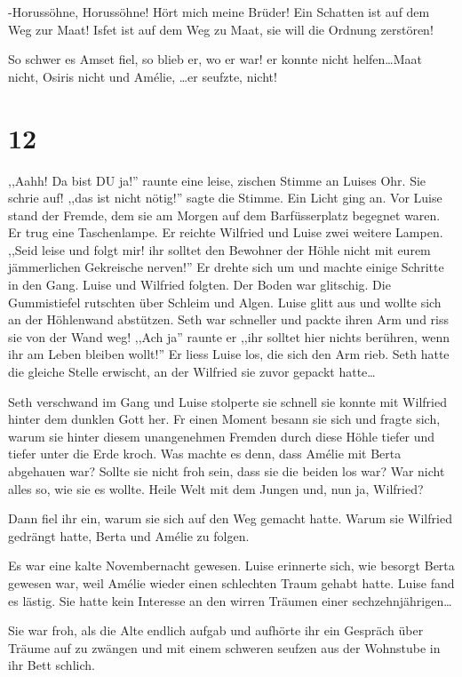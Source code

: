 -Horussöhne, Horussöhne! Hört mich meine Brüder! Ein Schatten ist auf dem Weg zur Maat! Isfet ist auf dem Weg zu Maat, sie will die Ordnung  zerstören!

So schwer es Amset fiel, so blieb er, wo er war! er konnte nicht helfen\dots Maat nicht, Osiris nicht und Amélie, \dots er seufzte, nicht!

\section*{12}

,,Aahh! Da bist DU ja!'' raunte eine leise, zischen Stimme an Luises Ohr. Sie schrie auf! ,,das ist nicht nötig!'' sagte die Stimme. Ein Licht ging an. Vor Luise stand der Fremde, dem sie am Morgen auf dem Barfüsserplatz begegnet waren. Er trug eine Taschenlampe. Er reichte Wilfried und Luise zwei weitere Lampen. ,,Seid leise und folgt mir! ihr solltet den Bewohner der Höhle nicht mit eurem jämmerlichen Gekreische nerven!'' Er drehte sich um und machte einige Schritte in den Gang. Luise und Wilfried folgten. Der Boden war glitschig. Die Gummistiefel rutschten über Schleim und Algen. Luise glitt aus und wollte sich an der Höhlenwand abstützen. Seth war schneller und packte ihren Arm und riss sie von der Wand weg! ,,Ach ja'' raunte er ,,ihr solltet hier nichts berühren, wenn ihr am Leben bleiben wollt!'' Er liess Luise los, die sich den Arm rieb. Seth hatte die gleiche Stelle erwischt, an der Wilfried sie zuvor gepackt hatte\dots

Seth verschwand im Gang und Luise stolperte sie schnell sie konnte mit Wilfried hinter dem dunklen Gott her. Fr einen Moment besann sie sich und fragte sich, warum sie hinter diesem unangenehmen Fremden durch diese Höhle tiefer und tiefer unter die Erde kroch. Was machte es denn, dass Amélie mit Berta abgehauen war? Sollte sie nicht froh sein, dass sie die beiden los war? War nicht alles so, wie sie es wollte. Heile Welt mit dem Jungen und, nun ja, Wilfried?

Dann fiel ihr ein, warum sie sich auf den Weg gemacht hatte. Warum sie Wilfried gedrängt hatte, Berta und Amélie zu folgen. 

Es war eine kalte Novembernacht gewesen. Luise erinnerte sich, wie besorgt Berta gewesen war, weil Amélie wieder einen schlechten Traum gehabt hatte. Luise fand es lästig. Sie hatte kein Interesse an den wirren Träumen einer sechzehnjährigen\dots

Sie war froh, als die Alte endlich aufgab und aufhörte ihr ein Gespräch über Träume auf zu zwängen und mit einem schweren seufzen aus der Wohnstube in ihr Bett schlich.

